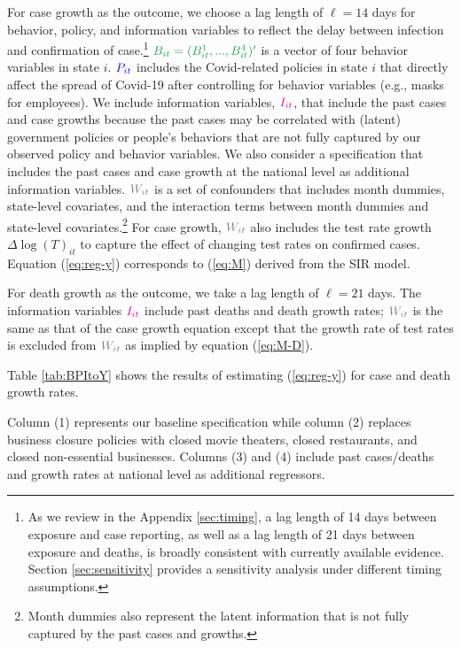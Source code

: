 \documentclass[3p, longtitle]{elsarticle}
\theoremstyle{definition}
\def\bcolor{\color{ForestGreen}}
\def\pcolor{\color{blue}}
\def\icolor{\color{magenta}}
\def\wcolor{\color{gray}}
\begin{document}
For case growth as the outcome, we choose a lag length of $\ell=14$ days for behavior, policy, and information variables to reflect the delay between infection and
confirmation of case.\footnote{As we review in the Appendix \ref{sec:timing},
  a lag length of 14 days between exposure and case reporting, as well as a lag length of 21 days between exposure and deaths, is broadly consistent with currently
  available evidence. Section \ref{sec:sensitivity} provides a sensitivity analysis under different timing assumptions.  }   $\bcolor B_{it}=(B_{it}^1,...,B_{it}^4)'$ is a vector of four behavior
variables  in state $i$. $\pcolor P_{it}$ includes the Covid-related policies
in state $i$  that directly affect the spread of Covid-19
after controlling for behavior variables (e.g., masks for employees).
We include information variables,  $\icolor I_{it}$, that include the past cases and case growths
because  the past cases may be
correlated with (latent) government  policies or people's behaviors
that are not fully captured by our observed policy and behavior
variables. We also consider a specification that includes the past cases and case growth at the national level as additional information variables. $\wcolor W_{it}$ is a set of confounders that includes month dummies, state-level covariates,  and the interaction terms between month dummies and state-level covariates.\footnote{Month dummies also represent the latent information that is not fully captured by the past cases and growths.}
For case growth, $\wcolor W_{it}$ also includes the  test rate growth  $\Delta \log(T)_{it}$  to capture the effect of changing test rates on confirmed cases.
Equation (\ref{eq:reg-y}) corresponds to (\ref{eq:M})  derived from the SIR model.



For death growth as the outcome, we take a lag length of $\ell=21$ days. The information variables $\icolor I_{it}$ include  past deaths and death growth rates;  $\wcolor W_{it}$ is the same as that of the case growth equation except that the growth rate of test rates is excluded from $\wcolor W_{it}$ as implied by equation (\ref{eq:M-D}).


Table \ref{tab:BPItoY} shows
the results of estimating
(\ref{eq:reg-y}) for case and death growth rates. %

Column (1) represents our baseline specification while column (2) replaces business closure policies with closed movie theaters, closed restaurants, and closed non-essential businesses. Columns (3) and (4) include past cases/deaths and growth rates at national level as additional regressors.
\end{document}
